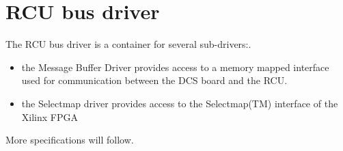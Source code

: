 \hypertarget{group__rcubus__driver}{
\section{RCU bus driver}
\label{group__rcubus__driver}
}
The RCU bus driver is a container for several sub-drivers:.  
\begin{itemize}
\item the Message Buffer Driver provides access to a memory mapped interface used for communication between the DCS board and the RCU.\item the Selectmap driver provides access to the Selectmap(TM) interface of the Xilinx FPGA\end{itemize}


More specifications will follow. 